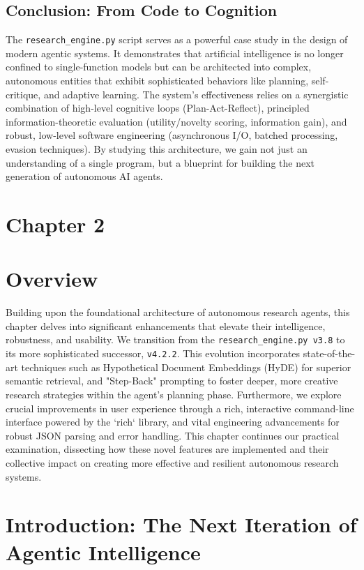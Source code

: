 \documentclass[12pt, a4paper]{article}
\begin{document}
\subsection{Conclusion: From Code to Cognition}
The \texttt{research\_engine.py} script serves as a powerful case study in the design of modern agentic systems. It demonstrates that artificial intelligence is no longer confined to single-function models but can be architected into complex, autonomous entities that exhibit sophisticated behaviors like planning, self-critique, and adaptive learning. The system's effectiveness relies on a synergistic combination of high-level cognitive loops (Plan-Act-Reflect), principled information-theoretic evaluation (utility/novelty scoring, information gain), and robust, low-level software engineering (asynchronous I/O, batched processing, evasion techniques). By studying this architecture, we gain not just an understanding of a single program, but a blueprint for building the next generation of autonomous AI agents.


\section{Chapter 2}
\section{Overview}
Building upon the foundational architecture of autonomous research agents, this chapter delves into significant enhancements that elevate their intelligence, robustness, and usability. We transition from the \verb|research_engine.py v3.8| to its more sophisticated successor, \verb|v4.2.2|. This evolution incorporates state-of-the-art techniques such as Hypothetical Document Embeddings (HyDE) for superior semantic retrieval, and "Step-Back" prompting to foster deeper, more creative research strategies within the agent's planning phase. Furthermore, we explore crucial improvements in user experience through a rich, interactive command-line interface powered by the `rich` library, and vital engineering advancements for robust JSON parsing and error handling. This chapter continues our practical examination, dissecting how these novel features are implemented and their collective impact on creating more effective and resilient autonomous research systems.

\section{Introduction: The Next Iteration of Agentic Intelligence}
\end{document}
